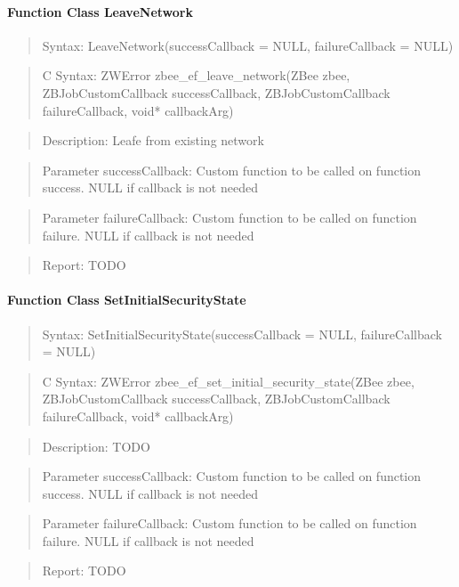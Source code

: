 \paragraph{Function Class LeaveNetwork}
\begin{quote}Syntax: LeaveNetwork(successCallback = NULL, failureCallback = NULL)\end{quote}
\begin{quote}C Syntax: ZWError zbee\_ef\_leave\_network(ZBee zbee, ZBJobCustomCallback successCallback, ZBJobCustomCallback failureCallback, void* callbackArg)\end{quote}
\begin{quote}Description: Leafe from existing network\end{quote}
\begin{quote}Parameter successCallback: Custom function to be called on function success. NULL if callback is not needed\end{quote}
\begin{quote}Parameter failureCallback: Custom function to be called on function failure. NULL if callback is not needed\end{quote}
\begin{quote}Report: TODO\end{quote}

\paragraph{Function Class SetInitialSecurityState}
\begin{quote}Syntax: SetInitialSecurityState(successCallback = NULL, failureCallback = NULL)\end{quote}
\begin{quote}C Syntax: ZWError zbee\_ef\_set\_initial\_security\_state(ZBee zbee, ZBJobCustomCallback successCallback, ZBJobCustomCallback failureCallback, void* callbackArg)\end{quote}
\begin{quote}Description: TODO\end{quote}
\begin{quote}Parameter successCallback: Custom function to be called on function success. NULL if callback is not needed\end{quote}
\begin{quote}Parameter failureCallback: Custom function to be called on function failure. NULL if callback is not needed\end{quote}
\begin{quote}Report: TODO\end{quote}

